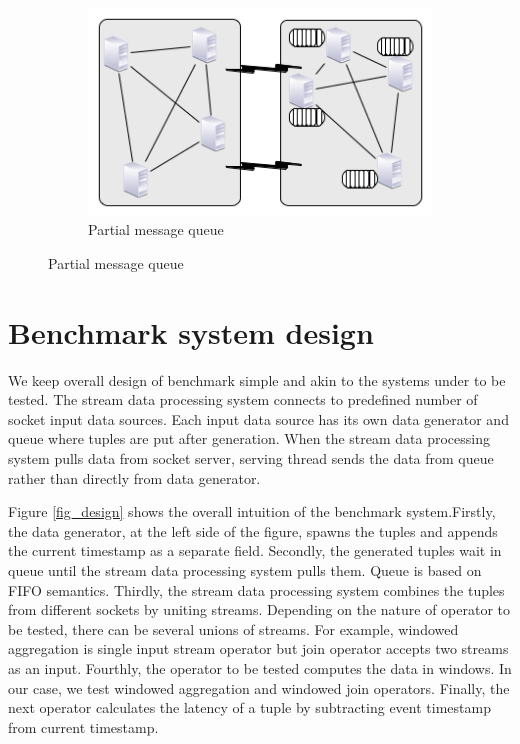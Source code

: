 \documentclass{vldb}
\begin{document}
\begin{figure}
\begin{subfigure}[b]{0.4\textwidth}
        \includegraphics[width=\textwidth]{node_queue}
        \caption{Partial message queue}
        \label{fig_partial_queue}
    \end{subfigure}
    \label{fig_queue_link}
\end{figure}



\section{Benchmark system design}
We keep overall design of benchmark simple and akin to the systems under to be tested.  
The stream data processing system connects to predefined number of socket input data sources. Each input data source has its own data generator and queue where tuples are put after generation. When the stream data processing system pulls  data from socket server, serving thread sends the data from queue rather than  directly from data generator. 

Figure \ref{fig_design} shows the overall intuition of the benchmark system.Firstly, the data generator, at the left side of the figure, spawns the tuples and appends the current timestamp as a separate field. Secondly, the generated tuples wait in queue until the stream data processing system pulls them. Queue is based on FIFO semantics. Thirdly, the stream data processing system combines the tuples from different sockets by uniting streams. Depending on the nature of operator to be tested, there can be several unions of streams. For example, windowed aggregation is single input stream operator but join operator accepts two streams as an input. Fourthly, the operator to be tested computes the data in windows. In our case, we test windowed aggregation and windowed join operators. Finally, the next operator calculates the latency of a tuple by subtracting event timestamp from current timestamp.
\end{document}
